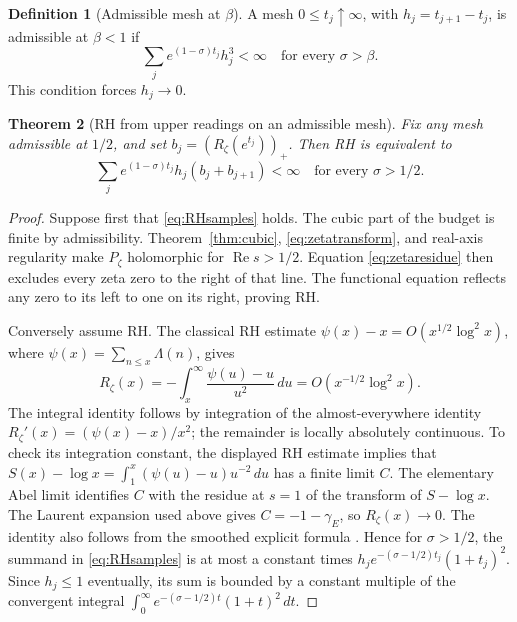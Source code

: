 \documentclass[11pt,a4paper]{article}
\newtheorem{theorem}{Theorem}[section]
\theoremstyle{definition}
\newtheorem{definition}[theorem]{Definition}
\theoremstyle{remark}
\numberwithin{equation}{section}
\newcommand{\Rea}{\operatorname{Re}}
\begin{document}
\begin{definition}[Admissible mesh at \(\beta\)]
A mesh \(0\leq t_j\uparrow\infty\), with \(h_j=t_{j+1}-t_j\), is
admissible at \(\beta<1\) if
\[
 \sum_j e^{(1-\sigma)t_j}h_j^3<\infty
 \quad\text{for every }\sigma>\beta.
\]
This condition forces \(h_j\to0\).
\end{definition}

\begin{theorem}[RH from upper readings on an admissible mesh]
\label{thm:RH-equivalence}
Fix any mesh admissible at \(1/2\), and set
\(b_j=(R_\zeta(e^{t_j}))_+\). Then RH is equivalent to
\begin{equation}
 \sum_j e^{(1-\sigma)t_j}h_j(b_j+b_{j+1})<\infty
 \quad\text{for every }\sigma>1/2.
 \label{eq:RHsamples}
\end{equation}
\end{theorem}

\begin{proof}
Suppose first that \eqref{eq:RHsamples} holds. The cubic part of the
budget is finite by admissibility. Theorem~\ref{thm:cubic},
\eqref{eq:zetatransform}, and real-axis regularity make
\(P_\zeta\) holomorphic for \(\Rea s>1/2\). Equation
\eqref{eq:zetaresidue} then excludes every zeta zero to the right of
that line. The functional equation reflects any zero to its left to
one on its right, proving RH.

Conversely assume RH. The classical RH estimate
\(\psi(x)-x=O(x^{1/2}\log^2x)\), where
\(\psi(x)=\sum_{n\leq x}\Lambda(n)\), gives
\begin{equation}
 R_\zeta(x)=-\int_x^\infty\frac{\psi(u)-u}{u^2}\,du
       =O(x^{-1/2}\log^2x).
 \label{eq:RHbound}
\end{equation}
The integral identity follows by integration of the almost-everywhere
identity \(R_\zeta'(x)=(\psi(x)-x)/x^2\); the remainder is locally
absolutely continuous.
To check its integration constant, the displayed RH estimate implies
that \(S(x)-\log x=\int_1^x(\psi(u)-u)u^{-2}\,du\) has a finite
limit \(C\). The elementary Abel limit identifies \(C\) with the
residue at \(s=1\) of the transform of \(S-\log x\).
The Laurent expansion used above gives \(C=-1-\gamma_E\), so
\(R_\zeta(x)\to0\). The identity also follows from the smoothed
explicit formula \cite{mv,rubinstein}.
Hence for \(\sigma>1/2\), the summand in
\eqref{eq:RHsamples} is at most a constant times
\(h_j e^{-(\sigma-1/2)t_j}(1+t_j)^2\). Since \(h_j\leq1\)
eventually, its sum is bounded by a constant multiple of the
convergent integral
\(\int_0^\infty e^{-(\sigma-1/2)t}(1+t)^2\,dt\).
\end{proof}
\end{document}
